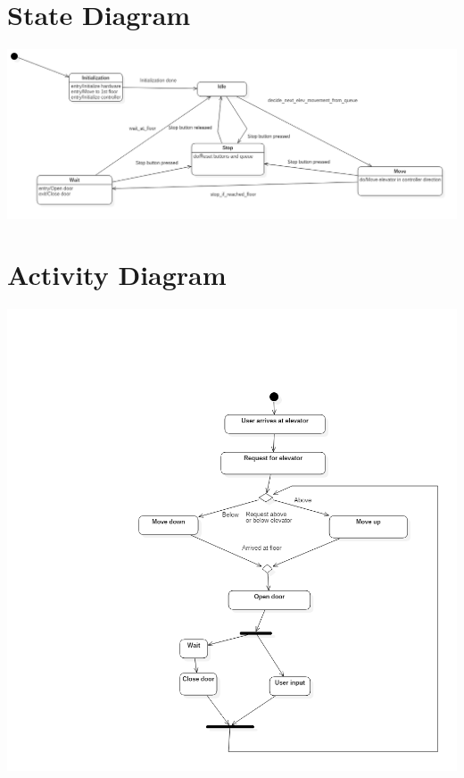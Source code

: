 \documentclass[a4paper, norsk]{article}
\begin{document}
\section{State Diagram}
\includegraphics[width=\textwidth]{./StateMachine1__StatechartDiagram1_3.png}

\section{Activity Diagram}
\includegraphics[width=\textwidth]{./Activity1__ActivityDiagram1_4.png}
\end{document}
